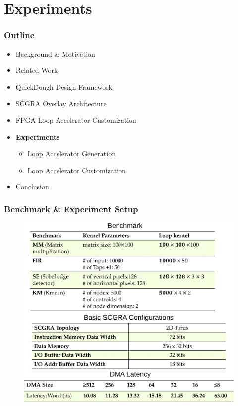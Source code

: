 \documentclass[accentcolor=tud1a,colorbacktitle,inverttitle,landscape,german,presentation,t]{tudbeamer}
\begin{document}
\section{Experiments}
  \begin{frame}
  \frametitle{Outline}
  \begin{itemize}
  \setlength{\itemsep}{6pt}
  \item Background \& Motivation
  \item Related Work
  \item QuickDough Design Framework
  \item SCGRA Overlay Architecture
  \item FPGA Loop Accelerator Customization
  \item \textbf{Experiments}
  \begin{itemize}
    \setlength{\itemsep}{6pt}
    \item Loop Accelerator Generation
    \item Loop Accelerator Customization
  \end{itemize}
  \item Conclusion
  \end{itemize}
  \end{frame}

  \begin{frame}
  \frametitle{Benchmark \& Experiment Setup}
  \vspace{-1em}
  \begin{figure}
    \includegraphics[width=.75\linewidth]{benchmark-setup}
  \end{figure}
  \end{frame}
\end{document}
